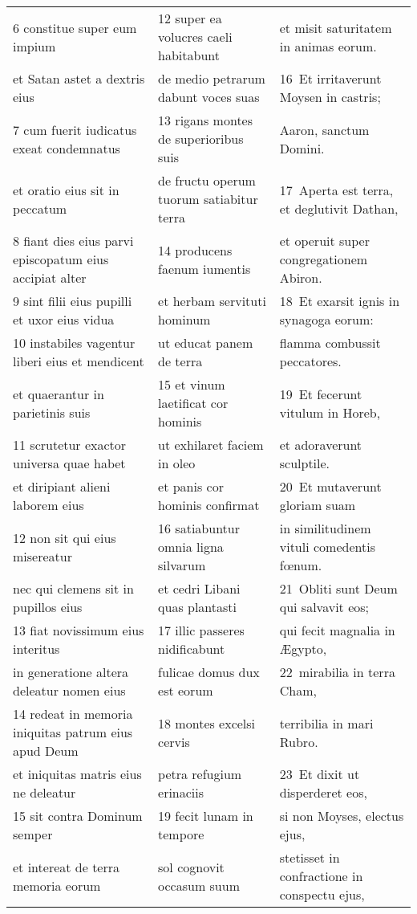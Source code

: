 \documentclass{article}
\begin{document}
\begin{longtable}{@{}p{}p{}p{}@{}}
6 constitue super eum impium	&	12 super ea volucres caeli habitabunt	&	et misit saturitatem in animas eorum.	\\
et Satan astet a dextris eius	&	de medio petrarum dabunt voces suas	&	16 Et irritaverunt Moysen in castris;	\\
7 cum fuerit iudicatus exeat condemnatus	&	13 rigans montes de superioribus suis	&	Aaron, sanctum Domini.	\\
et oratio eius sit in peccatum	&	de fructu operum tuorum satiabitur terra	&	17 Aperta est terra, et deglutivit Dathan,	\\
8 fiant dies eius parvi episcopatum eius accipiat alter	&	14 producens faenum iumentis	&	et operuit super congregationem Abiron.	\\
9 sint filii eius pupilli et uxor eius vidua	&	et herbam servituti hominum	&	18 Et exarsit ignis in synagoga eorum:	\\
10 instabiles vagentur liberi eius et mendicent	&	ut educat panem de terra	&	flamma combussit peccatores.	\\
et quaerantur in parietinis suis	&	15 et vinum laetificat cor hominis	&	19 Et fecerunt vitulum in Horeb,	\\
11 scrutetur exactor universa quae habet	&	ut exhilaret faciem in oleo	&	et adoraverunt sculptile.	\\
et diripiant alieni laborem eius	&	et panis cor hominis confirmat	&	20 Et mutaverunt gloriam suam	\\
12 non sit qui eius misereatur	&	16 satiabuntur omnia ligna silvarum	&	in similitudinem vituli comedentis fœnum.	\\
nec qui clemens sit in pupillos eius	&	et cedri Libani quas plantasti	&	21 Obliti sunt Deum qui salvavit eos;	\\
13 fiat novissimum eius interitus	&	17 illic passeres nidificabunt	&	qui fecit magnalia in Ægypto,	\\
in generatione altera deleatur nomen eius	&	fulicae domus dux est eorum	&	22 mirabilia in terra Cham,	\\
14 redeat in memoria iniquitas patrum eius apud Deum	&	18 montes excelsi cervis	&	terribilia in mari Rubro.	\\
et iniquitas matris eius ne deleatur	&	petra refugium erinaciis	&	23 Et dixit ut disperderet eos,	\\
15 sit contra Dominum semper	&	19 fecit lunam in tempore	&	si non Moyses, electus ejus,	\\
et intereat de terra memoria eorum	&	sol cognovit occasum suum	&	stetisset in confractione in conspectu ejus,	\\

\end{longtable}
\end{document}
